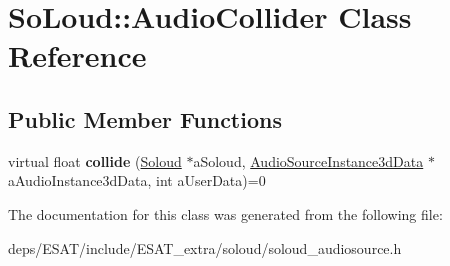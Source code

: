 \hypertarget{class_so_loud_1_1_audio_collider}{}\section{So\+Loud\+:\+:Audio\+Collider Class Reference}
\label{class_so_loud_1_1_audio_collider}
\subsection*{Public Member Functions}
\begin{DoxyCompactItemize}
\item 
\mbox{\label{class_so_loud_1_1_audio_collider_afc4a1abeaa2a01d3df696c33a01c9eac}} 
virtual float {\bfseries collide} (\mbox{\hyperlink{class_so_loud_1_1_soloud}{Soloud}} $\ast$a\+Soloud, \mbox{\hyperlink{class_so_loud_1_1_audio_source_instance3d_data}{Audio\+Source\+Instance3d\+Data}} $\ast$a\+Audio\+Instance3d\+Data, int a\+User\+Data)=0
\end{DoxyCompactItemize}


The documentation for this class was generated from the following file\+:\begin{DoxyCompactItemize}
\item 
deps/\+E\+S\+A\+T/include/\+E\+S\+A\+T\+\_\+extra/soloud/soloud\+\_\+audiosource.\+h\end{DoxyCompactItemize}

